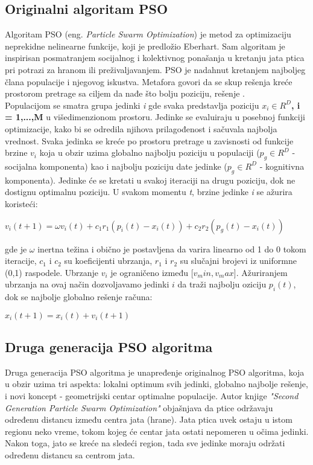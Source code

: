\documentclass[a4paper]{article}
\begin{document}
{\subsection{Originalni algoritam PSO}
\label{subsec:opso}
Algoritam PSO (eng. \textit{Particle Swarm Optimization}) je metod za optimizaciju neprekidne nelinearne funkcije, koji je predložio Eberhart.
Sam algoritam je inspirisan posmatranjem socijalnog i kolektivnog ponašanja u kretanju jata ptica pri potrazi za hranom ili preživaljavanjem.
PSO je nadahnut kretanjem najboljeg člana populacije i njegovog iskustva. Metafora govori da se skup rešenja kreće prostorom pretrage sa ciljem da nađe što bolju poziciju, rešenje \cite{hindawi}.
\\
Populacijom se smatra grupa jedinki \textit{i} gde svaka predstavlja poziciju \textbf{\textbf{$x_i \in R^D$, i = 1,...,M}} u višedimenzionom prostoru.
Jedinke se evaluiraju u posebnoj funkciji optimizacije, kako bi se odredila njihova prilagođenost i sačuvala najbolja vrednost. Svaka jedinka se kreće po
prostoru pretrage u zavisnosti od funkcije brzine \textbf{$v_i$} koja u obzir uzima globalno najbolju poziciju u populaciji ($p_g \in R^D$ - socijalna
komponenta) kao i najbolju poziciju date jedinke ($p_g \in R^D$ - kognitivna komponenta). Jedinke će se kretati u svakoj iteraciji na drugu poziciju,
dok ne dostignu optimalnu poziciju. U svakom momentu \textit{t}, brzine jedinke \textit{i} se ažurira koristeći: 
\begin{center}
\textbf\textit{$v_i(t+1) = \omega v_i(t) + c_1 r_1(p_i (t) - x_i (t)) + c_2 r_2 (p_g (t) - x_i (t))$}
\end{center}
gde je $\omega$ inertna težina i obično je postavljena da varira linearno od 1 do 0 tokom iteracije, $c_1$ i $c_2$ su koeficijenti ubrzanja, $r_1$ i $r_2$
su slučajni brojevi iz uniformne (0,1) raspodele. Ubrzanje \textbf{$v_i$} je ograničeno između [$v_min, v_max$]. Ažuriranjem ubrzanja na ovaj 
način dozvoljavamo jedinki $i$ da traži najbolju oziciju \textbf{$p_i(t)$}, dok se najbolje globalno rešenje računa:\cite{hindawi}
\begin{center}
\textbf\textit{$x_i(t+1) = x_i(t) + v_i(t+1)$}
\end{center} 

\subsection{Druga generacija PSO algoritma}
\label{subsec:sgpso}
Druga generacija PSO algoritma je unapređenje originalnog PSO algoritma, koja u obzir uzima tri aspekta: lokalni optimum svih jedinki,
globalno najbolje rešenje, i novi koncept - geometrijski centar optimalne populacije. Autor knjige \textit{"{}Second Generation Particle Swarm Optimization"} objašnjava da ptice održavaju 
određenu distancu između centra jata (hrane). Jata ptica uvek ostaju u istom regionu neko vreme, tokom kojeg će centar jata ostati
nepomeren u očima jedinki. Nakon toga, jato se kreće na sledeći region, tada sve jedinke moraju održati određenu distancu sa centrom jata.

}
\end{document}

